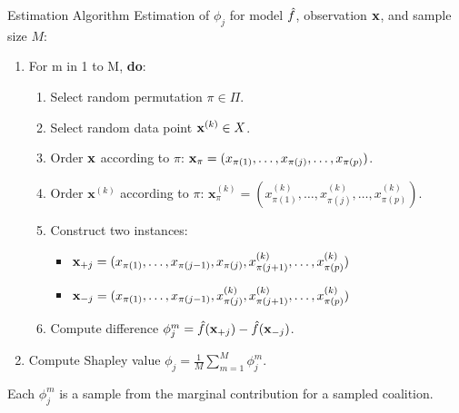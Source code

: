 \documentclass[11pt,compress,t,notes=noshow, aspectratio=169, xcolor=table]{beamer}
\begin{document}
\newcommand{\xk}{\mathbf{x}^{(k)}}

\begin{vbframe}{Estimation Algorithm }
Estimation of $\phi_j$ for model $\fh$, observation $\xv$, and sample size $M$:
\vspace{0.25cm}
  \begin{enumerate}
      \item For m in 1 to M, \textbf{do}:
      \begin{enumerate}
        \item Select random permutation $\pi \in \Pi$.
        \item Select random data point $\xv^{(k)} \in X$.
        \item Order $\xv$ according to $\pi$: $\xv_{\pi} = (x_{\pi(1)}, \ldots, x_{\pi(j)}, \ldots, x_{\pi(p)})$.
        \item Order $\xk$ according to $\pi$: $\xk_{\pi} = (x^{(k)}_{\pi(1)}, \ldots, x^{(k)}_{\pi(j)}, \ldots, x^{(k)}_{\pi(p)})$.
        \item Construct two instances:
          \begin{itemize}
            \item $\xv_{+j} = (x_{\pi(1)}, \ldots, x_{\pi(j - 1)}, x_{\pi(j)}, x^{(k)}_{\pi(j + 1)}, \ldots, x^{(k)}_{\pi(p)}) $
            \item $\xv_{-j} = (x_{\pi(1)}, \ldots, x_{\pi(j - 1)}, x^{(k)}_{\pi(j)}, x^{(k)}_{\pi(j + 1)}, \ldots, x^{(k)}_{\pi(p)}) $
          \end{itemize}
        \item Compute difference $\phi_j^m = \fh(\xv_{+j}) - \fh(\xv_{-j})$.
      \end{enumerate}
    \item Compute Shapley value $\phi_j = \frac{1}{M}\sum_{m=1}^M \phi_j^m$.
  \end{enumerate}

  Each $\phi_j^m$ is a sample from the marginal contribution for a sampled coalition.


\end{vbframe}
\end{document}
